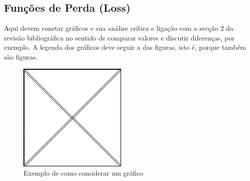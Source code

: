 \subsection{Funções de Perda (Loss) \label{se:archs_epocs}}


Aqui devem constar gráficos e sua análise crítica e ligação com a secção 2 da revisão bibliográfica no sentido de comparar valores e discutir diferenças, por exemplo. A legenda dos gráficos deve seguir a das figuras, isto é, porque também são figuras.

\begin{figure}[H]
\centering
\includegraphics[width=150pt, keepaspectratio]{Imagens/FigA.png}
\caption{Exemplo de como considerar um gráfico}
\label{fig:grafico1} %
\end{figure}
